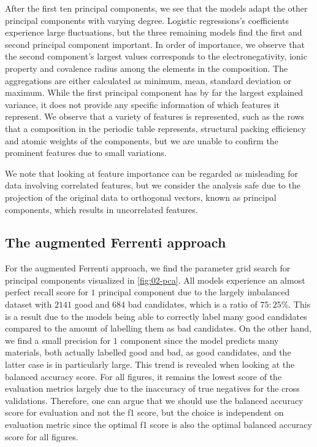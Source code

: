 After the first ten principal components, we see that the models adapt the other principal components with varying degree. Logistic regressions's coefficients experience large fluctuations, but the three remaining models find the first and second principal component important. In order of importance, we observe that the second component's largest values corresponds to the electronegativity, ionic property and covalence radius among the elements in the composition. The aggregations are either calculated as minimum, mean, standard deviation or maximum. While the first principal component has by far the largest explained variance, it does not provide any specific information of which features it represent. We observe that a variety of features is represented, such as the rows that a composition in the periodic table represents, structural packing efficiency and atomic weights of the components, but we are unable to confirm the prominent features due to small variations.

We note that looking at feature importance can be regarded as misleading for data involving correlated features, but we consider the analysis safe due to the projection of the original data to orthogonal vectors, known as principal components, which results in uncorrelated features.

\clearpage

\subsection{The augmented Ferrenti approach}

For the augmented Ferrenti approach, we find the parameter grid search for principal components visualized in \autoref{fig:02-pca}. All models experience an almost perfect recall score for $1$ principal component due to the largely imbalanced dataset with $2141$ good and $684$ bad candidates, which is a ratio of $75:25 \%$. This is a result due to the models being able to correctly label many good candidates compared to the amount of labelling them as bad candidates. On the other hand, we find a small precision for $1$ component since the model predicts many materials, both actually labelled good and bad, as good candidates, and the latter case is in particularly large. This trend is revealed when looking at the balanced accuracy score. For all figures, it remains the lowest score of the evaluation metrics largely due to the inaccuracy of true negatives for the cross validations. Therefore, one can argue that we should use the balanced accuracy score for evaluation and not the f1 score, but the choice is independent on evaluation metric since the optimal f1 score is also the optimal balanced accuracy score for all figures.

